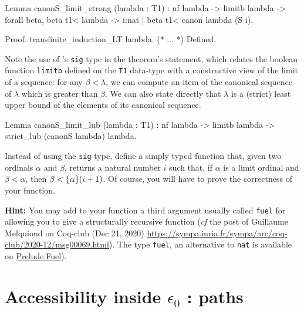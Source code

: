 \begin{Coqsrc}
Lemma canonS_limit_strong (lambda : T1) : 
     nf lambda ->
     limitb lambda  ->
     forall beta, beta t1< lambda ->
                  {i:nat | beta t1< canon lambda (S i)}.

Proof.
  transfinite_induction_LT lambda.
  (* ... *)
Defined.
\end{Coqsrc}

\label{lemma:canonS-limit}


Note the use of \coq's \texttt{sig} type in the theorem's statement, which
relates the boolean function \texttt{limitb} defined on the \texttt{T1} data-type with a constructive view of the limit of a sequence: for any $\beta<\lambda$, we can compute an item of the canonical sequence of $\lambda$ which is greater than $\beta$.
We can also state directly that $\lambda$ is a (strict) least upper bound of the elements of its canonical sequence.


\begin{Coqsrc}
Lemma canonS_limit_lub (lambda : T1) :
  nf lambda -> limitb lambda  ->
  strict_lub (canonS lambda) lambda.
\end{Coqsrc}


\begin{exercise}\label{exo:simply-typed-canonseq}
Instead of using the \texttt{sig} type, define a simply typed function that, given two ordinals $\alpha$ and $\beta$, returns a natural number $i$ such that, if $\alpha$ is a limit ordinal and $\beta<\alpha$, then $\beta< \mbox{$\{\alpha\}(i+1)$}$. Of course, you will have to prove the correctness of your function. 

\textbf{Hint:} You may add to your function a third argument usually called \texttt{fuel} for allowing you to give a structurally 
recursive function (\emph{cf} the post of Guillaume Melquiond on Coq-club (Dec 21, 2020)
\url{https://sympa.inria.fr/sympa/arc/coq-club/2020-12/msg00069.html}).
The type \texttt{fuel}, an alternative 
to \texttt{nat} is available on \href{../theories/html/hydras.Prelude.Fuel.html}{Prelude.Fuel}).

\end{exercise}






\section{Accessibility inside \texorpdfstring{$\epsilon_0$}{epsilon0} : paths}
\label{sect:pathes-intro}

